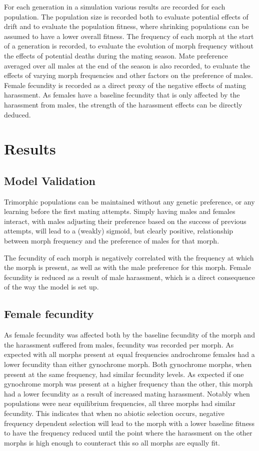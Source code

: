 \documentclass{article}
\begin{document}
For each generation in a simulation various results are recorded for each population. The population size is recorded both to evaluate potential effects of drift and to evaluate the population fitness, where shrinking populations can be assumed to have a lower overall fitness. The frequency of each morph at the start of a generation is recorded, to evaluate the evolution of morph frequency without the effects of potential deaths during the mating season. Mate preference averaged over all males at the end of the season is also recorded, to evaluate the effects of varying morph frequencies and other factors on the preference of males. Female fecundity is recorded as a direct proxy of the negative effects of mating harassment. As females have a baseline fecundity that is only affected by the harassment from males, the strength of the harassment effects can be directly deduced.

\section{Results}

\subsection{Model Validation}
Trimorphic populations can be maintained without any genetic preference, or any learning before the first mating attempts. Simply having males and females interact, with males adjusting their preference based on the success of previous attempts, will lead to a (weakly) sigmoid, but clearly positive, relationship between morph frequency and the preference of males for that morph.

The fecundity of each morph is negatively correlated with the frequency at which the morph is present, as well as with the male preference for this morph. Female fecundity is reduced as a result of male harassment, which is a direct consequence of the way the model is set up.

\subsection{Female fecundity}
As female fecundity was affected both by the baseline fecundity of the morph and the harassment suffered from males, fecundity was recorded per morph. As expected with all morphs present at equal frequencies androchrome females had a lower fecundity than either gynochrome morph. Both gynochrome morphs, when present at the same frequency, had similar fecundity levels. As expected if one gynochrome morph was present at a higher frequency than the other, this morph had a lower fecundity as a result of increased mating harassment. Notably when populations were near equilibrium frequencies, all three morphs had similar fecundity. This indicates that when no abiotic selection occurs, negative frequency dependent selection will lead to the morph with a lower baseline fitness to have the frequency reduced until the point where the harassment on the other morphs is high enough to counteract this so all morphs are equally fit.
\end{document}
